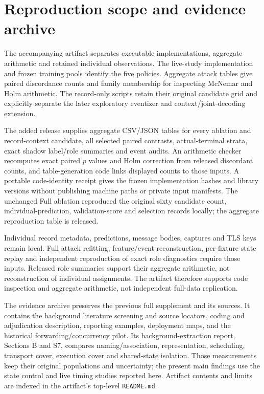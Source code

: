 \section{Reproduction scope and evidence archive}
The accompanying artifact separates executable implementations, aggregate arithmetic and retained individual observations. The live-study implementation and frozen training pools identify the five policies. Aggregate attack tables give paired discordance counts and family membership for inspecting McNemar and Holm arithmetic. The record-only scripts retain their original candidate grid and explicitly separate the later exploratory eventizer and context/joint-decoding extension.

The added release supplies aggregate CSV/JSON tables for every ablation and record-context candidate, all selected paired contrasts, actual-terminal strata, exact shadow label/role summaries and event audits. An arithmetic checker recomputes exact paired $p$ values and Holm correction from released discordant counts, and table-generation code links displayed counts to those inputs. A portable code-identity receipt gives the frozen implementation hashes and library versions without publishing machine paths or private input manifests. The unchanged Full ablation reproduced the original sixty candidate count, individual-prediction, validation-score and selection records locally; the aggregate reproduction table is released.

Individual record metadata, predictions, message bodies, captures and TLS keys remain local. Full attack refitting, feature/event reconstruction, per-fixture state replay and independent reproduction of exact role diagnostics require those inputs. Released role summaries support their aggregate arithmetic, not reconstruction of individual assignments. The artifact therefore supports code inspection and aggregate arithmetic, not independent full-data replication.

The evidence archive preserves the previous full supplement and its sources. It contains the background literature screening and source locators, coding and adjudication description, reporting examples, deployment maps, and the historical forwarding/concurrency pilot. Its background-extraction report, Sections B and S7, compares naming/association, representation, scheduling, transport cover, execution cover and shared-state isolation. Those measurements keep their original populations and uncertainty; the present main findings use the state control and live timing studies reported here. Artifact contents and limits are indexed in the artifact's top-level \texttt{README.md}.

